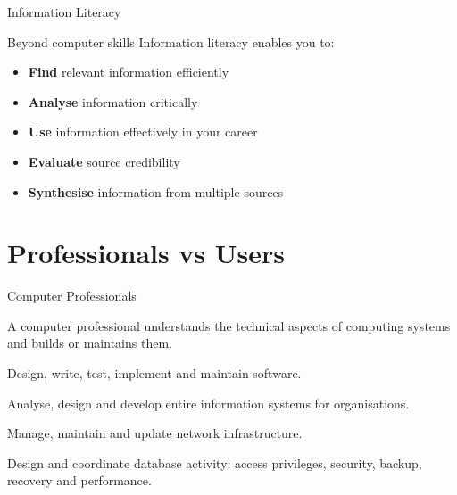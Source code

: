 \documentclass[aspectratio=169]{beamer}
\begin{document}
\begin{frame}{Information Literacy}
  \begin{block}{Beyond computer skills}
    Information literacy enables you to:
    \begin{itemize}[<+->]
      \item \textbf{Find} relevant information efficiently
      \item \textbf{Analyse} information critically
      \item \textbf{Use} information effectively in your career
      \item \textbf{Evaluate} source credibility
      \item \textbf{Synthesise} information from multiple sources
    \end{itemize}
  \end{block}
  \vspace{0.2cm}
\end{frame}

\section{Professionals vs Users}

\begin{frame}{Computer Professionals}
  \begin{definition}
    A computer professional understands the technical aspects of computing
    systems and builds or maintains them.
  \end{definition}
  \vspace{0.3cm}
  \begin{description}[<+->]
    \item[\faCode\, Software Engineer / Programmer]
      Design, write, test, implement and maintain software.
    \item[\faProjectDiagram\, Systems Analyst]
      Analyse, design and develop entire information systems for organisations.
    \item[\faNetworkWired\, Network Administrator]
      Manage, maintain and update network infrastructure.
    \item[\faDatabase\, Database Administrator]
      Design and coordinate database activity: access privileges, security,
      backup, recovery and performance.
  \end{description}
\end{frame}
\end{document}

